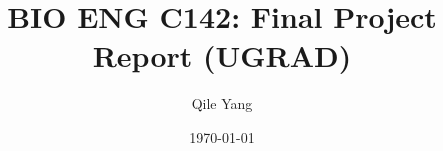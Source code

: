 \documentclass[10pt, twoside]{article}
\title{BIO ENG C142: Final Project Report (UGRAD)}
\author{Qile Yang}
\date{\today}
\begin{document}
\maketitle

\begin{abstract}
    \lipsum[1] 
\end{abstract}

\begin{multicols}{2}
    
\end{multicols}
\end{document}
